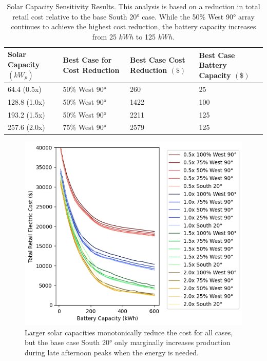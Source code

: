 \documentclass[conference]{IEEEtran}
\begin{document}
\begin{table}[h]
  \centering
  \caption{Solar Capacity Sensitivity Results. This analysis is based on a reduction in total retail cost relative to the base South 20° case. While the 50\% West 90° array continues to achieve the highest cost reduction, the battery capacity increases from 25 $kWh$ to 125 $kWh$.}
  \label{tab:solar-sensitivity}
  \begin{tabular}{ p{3cm} p{2cm} p{2cm} p{2.8cm} }
    \hline
    \textbf{Solar Capacity} $(kW_p)$ & \textbf{Best Case for Cost Reduction} & \textbf{Best Case Cost Reduction $(\$)$} & \textbf{Best Case Battery Capacity}
    $(\$)$                                                                                                                                                       \\
    \hline
    64.4 (0.5x)                         & 50\% West 90°                         & 260                                      & 25                                  \\
    128.8 (1.0x)                        & 50\% West 90°                         & 1422                                     & 100                                 \\
    193.2 (1.5x)                        & 50\% West 90°                         & 2211                                     & 125                                 \\
    257.6 (2.0x)                        & 75\% West 90°                         & 2579                                     & 125                                 \\
    \hline
  \end{tabular}
\end{table}


\begin{figure}
    \centering
    \includegraphics[width=1\linewidth]{images/total cost reduction solar sensitivity.png}
    \caption{Larger solar capacities monotonically reduce the cost for all cases, but the base case South 20° only marginally increases production during late afternoon peaks when the energy is needed.}
    \label{fig:solar-sensitivity}
\end{figure}
\end{document}
